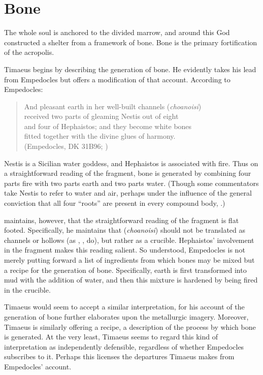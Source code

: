 
\section{Bone} %
\label{sec:bone}

The whole soul is anchored to the divided marrow, and around this God constructed a shelter from a framework of bone. Bone is the primary fortification of the acropolis.

Timaeus begins by describing the generation of bone. He evidently takes his lead from Empedocles but offers a modification of that account. According to Empedocles:
\begin{verse}
	And pleasant earth in her well-built channels (\emph{choanoisi})\\
	received two parts of gleaming Nestis out of eight\\
	and four of Hephaistos; and they become white bones\\
	fitted together with the divine glues of harmony.\\
	(Empedocles, DK 31B96; \citealt[62 245]{Inwood:2001ve})
\end{verse}
Nestis is a Sicilian water goddess, and Hephaistos is associated with fire. Thus on a straightforward reading of the fragment, bone is generated by combining four parts fire with two parts earth and two parts water. (Though some commentators take Nestis to refer to water and air, perhaps under the influence of the general conviction that all four ``roots'' are present in every compound body, \citealt[209 n2]{Wright:1981zr}.) 

\citet[301-2]{Palmer:2009qf} maintains, however, that the straightforward reading of the fragment is flat footed. Specifically, he maintains that (\emph{choanoisi}) should not be translated as channels or hollows (as \citealt[151 n1]{Guthrie:1965ys}, \citealt[208--9]{Wright:1981zr}, \citealt[62 245]{Inwood:2001ve} do), but rather as a crucible. Hephaistos' involvement in the fragment makes this reading salient. So understood, Empedocles is not merely putting forward a list of ingredients from which bones may be mixed but a recipe for the generation of bone. Specifically, earth is first transformed into mud with the addition of water, and then this mixture is hardened by being fired in the crucible.

Timaeus would seem to accept a similar interpretation, for his account of the generation of bone further elaborates upon the metallurgic imagery. Moreover, Timaeus is similarly offering a recipe, a description of the process by which bone is generated. At the very least, Timaeus seems to regard this kind of interpretation as independently defensible, regardless of whether Empedocles subscribes to it. Perhaps this licenses the departures Timaeus makes from Empedocles' account. 


